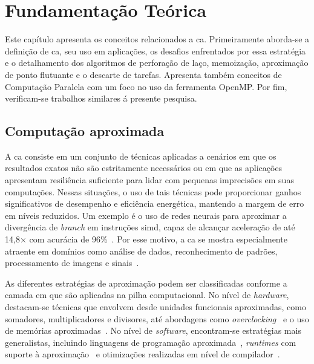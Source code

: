 \chapter{Fundamentaç\~ao Te\'orica}\label{cap:fundamentacaoTeorica}

Este capítulo apresenta os conceitos relacionados a \gls{ca}. Primeiramente aborda-se a definição de \gls{ca}, seu uso em aplicações, os desafios enfrentados por essa estratégia e o detalhamento dos algoritmos de perforação de laço, memoização, aproximação de ponto flutuante e o descarte de tarefas. Apresenta também conceitos de Computação Paralela com um foco no uso da ferramenta OpenMP. Por fim, verificam-se trabalhos similares á presente pesquisa.

\section{Computação aproximada}\label{sec:compAprox}

A \gls{ca} consiste em um conjunto de técnicas aplicadas a cenários em que os resultados exatos não são estritamente necessários ou em que as aplicações apresentam resiliência suficiente para lidar com pequenas imprecisões em suas computações. Nessas situações, o uso de tais técnicas pode proporcionar ganhos significativos de desempenho e eficiência energética, mantendo a margem de erro em níveis reduzidos. Um exemplo é o uso de redes neurais para aproximar a divergência de \textit{branch} em instruções \gls{simd}, capaz de alcançar aceleração de até 14,8$\times$ com acurácia de 96\%~\cite{grigorian2015}. Por esse motivo, a \gls{ca} se mostra especialmente atraente em domínios como análise de dados, reconhecimento de padrões, processamento de imagens e sinais~\cite{mittal2016, chippa2013}.

As diferentes estratégias de aproximação podem ser classificadas conforme a camada em que são aplicadas na pilha computacional. No nível de \textit{hardware}, destacam-se técnicas que envolvem desde unidades funcionais aproximadas, como somadores, multiplicadores e divisores, até abordagens como \textit{overclocking}~\cite{leon2025a,leon2025b} e o uso de memórias aproximadas~\cite{fabricio2020}. No nível de \textit{software}, encontram-se estratégias mais generalistas, incluindo linguagens de programação aproximada~\cite{sampson2015}, \textit{runtimes} com suporte à aproximação~\cite{li2018,reis2024} e otimizações realizadas em nível de compilador~\cite{oliveira2024a,oliveira2024b}.

